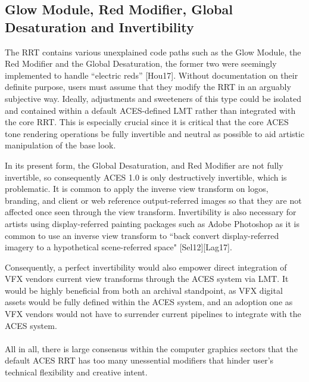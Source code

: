 \documentclass[conference]{IEEEtran}
\begin{document}
\subsection{Glow Module, Red Modifier, Global Desaturation and Invertibility}
The RRT contains various unexplained code paths such as the Glow Module, the Red Modifier and the Global Desaturation, the former two were seemingly implemented to handle “electric reds” [Hou17]. Without documentation on their definite purpose, users must assume that they modify the RRT in an arguably subjective way. Ideally, adjustments and sweeteners of this type could be isolated and contained within a default ACES-defined LMT rather than integrated with the core RRT. This is especially crucial since it is critical that the core ACES tone rendering operations be fully invertible and neutral as possible to aid artistic manipulation of the base look.

In its present form, the Global Desaturation, and Red Modifier are not fully invertible, so consequently ACES 1.0 is only destructively invertible, which is problematic. It is common to apply the inverse view transform on logos, branding, and client or web reference output-referred images so that they are not affected once seen through the view transform. Invertibility is also necessary for artists using display-referred painting packages such as Adobe Photoshop as it is common to use an inverse view transform to ``back convert display-referred imagery to a hypothetical scene-referred space" [Sel12][Lag17].

Consequently, a perfect invertibility would also empower direct integration of VFX vendors current view transforms through the ACES system via LMT. It would be highly beneficial from both an archival standpoint, as VFX digital assets would be fully defined within the ACES system, and an adoption one as VFX vendors would not have to surrender current pipelines to integrate with the ACES system.
\\ \\
All in all, there is large consensus within the computer graphics sectors that the default ACES RRT has too many unessential modifiers that hinder user's technical flexibility and creative intent.
\end{document}
